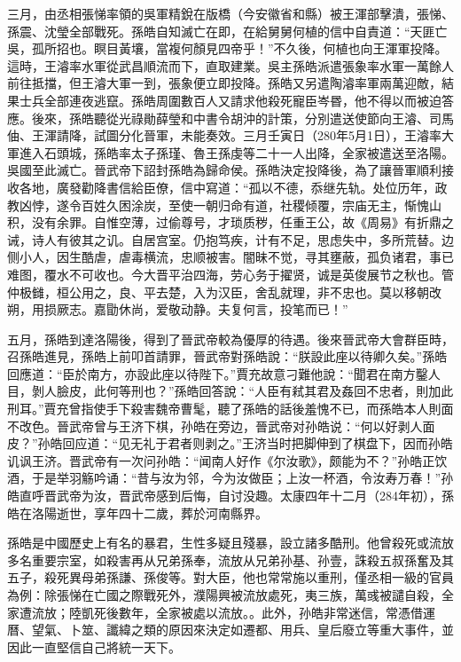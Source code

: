 三月，由丞相張悌率領的吳軍精銳在版橋（今安徽省和縣）被王渾部擊潰，張悌、孫震、沈瑩全部戰死。孫皓自知滅亡在即，在給舅舅何植的信中自責道：“天匪亡吳，孤所招也。瞑目黃壤，當複何顏見四帝乎！”不久後，何植也向王渾軍投降。這時，王濬率水軍從武昌順流而下，直取建業。吳主孫皓派遣張象率水軍一萬餘人前往抵擋，但王濬大軍一到，張象便立即投降。孫皓又另遣陶濬率軍兩萬迎敵，結果士兵全部連夜逃竄。孫皓周圍數百人又請求他殺死寵臣岑昬，他不得以而被迫答應。後來，孫皓聽從光祿勛薛瑩和中書令胡沖的計策，分別遣送使節向王濬、司馬伷、王渾請降，試圖分化晉軍，未能奏效。三月壬寅日（280年5月1日），王濬率大軍進入石頭城，孫皓率太子孫瑾、魯王孫虔等二十一人出降，全家被遣送至洛陽。吳國至此滅亡。晉武帝下詔封孫皓為歸命侯。孫皓決定投降後，為了讓晉軍順利接收各地，廣發勸降書信給臣僚，信中寫道：“孤以不德，忝继先轨。处位历年，政教凶悖，遂令百姓久困涂炭，至使一朝归命有道，社稷倾覆，宗庙无主，惭愧山积，没有余罪。自惟空薄，过偷尊号，才琐质秽，任重王公，故《周易》有折鼎之诫，诗人有彼其之讥。自居宫室。仍抱笃疾，计有不足，思虑失中，多所荒替。边侧小人，因生酷虐，虐毒横流，忠顺被害。闇昧不觉，寻其壅蔽，孤负诸君，事已难图，覆水不可收也。今大晋平治四海，劳心务于擢贤，诚是英俊展节之秋也。管仲极雠，桓公用之，良、平去楚，入为汉臣，舍乱就理，非不忠也。莫以移朝改朔，用损厥志。嘉勖休尚，爱敬动静。夫复何言，投笔而已！”

五月，孫皓到達洛陽後，得到了晉武帝較為優厚的待遇。後來晉武帝大會群臣時，召孫皓進見，孫皓上前叩首請罪，晉武帝對孫皓說：“朕設此座以待卿久矣。”孫皓回應道：“臣於南方，亦設此座以待陛下。”賈充故意刁難他說：“聞君在南方鑿人目，剝人臉皮，此何等刑也？”孫皓回答說：“人臣有弒其君及姦回不忠者，則加此刑耳。”賈充曾指使手下殺害魏帝曹髦，聽了孫皓的話後羞愧不已，而孫皓本人則面不改色。晉武帝曾与王济下棋，孙皓在旁边，晉武帝对孙皓说：“何以好剥人面皮？”孙皓回应道：“见无礼于君者则剥之。”王济当时把脚伸到了棋盘下，因而孙皓讥讽王济。晋武帝有一次问孙皓：“闻南人好作《尔汝歌》，颇能为不？”孙皓正饮酒，于是举羽觞吟诵：“昔与汝为邻，今为汝做臣；上汝一杯酒，令汝寿万春！”孙皓直呼晋武帝为汝，晋武帝感到后悔，自讨没趣。太康四年十二月（284年初），孫皓在洛陽逝世，享年四十二歲，葬於河南縣界。

孫皓是中國歷史上有名的暴君，生性多疑且殘暴，設立諸多酷刑。他曾殺死或流放多名重要宗室，如殺害再从兄弟孫奉，流放从兄弟孙基、孙壹，誅殺五叔孫奮及其五子，殺死異母弟孫謙、孫俊等。對大臣，他也常常施以重刑，僅丞相一級的官員為例：除張悌在亡國之際戰死外，濮陽興被流放處死，夷三族，萬彧被譴自殺，全家遭流放；陸凱死後數年，全家被處以流放。。此外，孙皓非常迷信，常憑借運曆、望氣、卜筮、讖緯之類的原因來決定如遷都、用兵、皇后廢立等重大事件，並因此一直堅信自己將統一天下。

